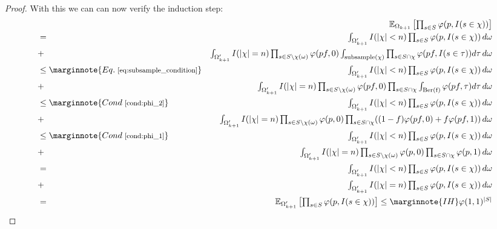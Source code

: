 \begin{proof}
With this we can can now verify the induction step:
\begin{eqnarray*}
&  & \textstyle\expect_{\Omega_{k+1}}\left[\prod_{s \in S} \phi(p, I(s \in \chi))\right]  \\
& = & \textstyle \int_{\Omega'_{k+1}} I(|\chi|<n)\prod_{s\in S} \phi(p, I(s \in \chi)) \, d \omega\\
& + & \textstyle \int_{\Omega'_{k+1}} I(|\chi|=n)
  \prod_{s \in S \setminus \chi(\omega)} \phi(pf,0) 
    \int_{\mathrm{subsample}(\chi)} \prod_{s \in S \cap \chi} \phi(pf,I(s \in \tau )) d \tau \, d \omega \\
& \leq \marginnote{\footnotesize Eq.~\ref{eq:subsample_condition}} & \textstyle \int_{\Omega'_{k+1}} 
  I(|\chi| < n)\prod_{s \in S} \phi(p, I(s \in \chi)) \, d \omega \\
& + & \textstyle \int_{\Omega'_{k+1}} I(|\chi| = n) \prod_{s \in S \setminus \chi(\omega)}
  \phi(pf,0) \prod_{s \in S \cap \chi} \int_{\mathrm{Ber(f)}} \phi(pf,\tau) d \tau \, d \omega  \\
& \leq \marginnote{\footnotesize Cond~\ref{cond:phi_2}}  &
  \textstyle \int_{\Omega'_{k+1}} I(|\chi| < n)\prod_{s \in S} \phi(p, I(s \in \chi)) \, d \omega \\
& + & \textstyle \int_{\Omega'_{k+1}} I(|\chi| = n) \prod_{s \in S \setminus \chi(\omega)} 
  \phi(p,0) \prod_{s \in S \cap \chi} ((1-f)\phi(pf,0)+f\phi(pf,1)) \, d \omega  \\
& \leq \marginnote{\footnotesize Cond~\ref{cond:phi_1}} & \textstyle \int_{\Omega'_{k+1}} I(|\chi| < n) 
  \prod_{s \in S} \phi(p, I(s \in \chi)) \, d \omega \\
& + & \textstyle \int_{\Omega'_{k+1}} I(|\chi| = n) \prod_{s \in S \setminus \chi(\omega)} 
  \phi(p,0) \prod_{s \in S \cap \chi} \phi(p,1) \, d \omega \\
& = & \textstyle \int_{\Omega'_{k+1}} I(|\chi|<n)\prod_{s \in S} \phi(p,I(s\in\chi)) \, d\omega \\
& + & \textstyle \int_{\Omega'_{k+1}} I(|\chi|=n)\prod_{s \in S} \phi(p,I(s\in\chi)) \, d\omega \\
& = & \textstyle \expect_{\Omega'_{k+1}}\left[\prod_{s \in S} \phi(p, I(s \in \chi)) \right] 
  \leq  \marginnote{\footnotesize IH} \phi(1,1)^{|S|}
\end{eqnarray*}
\end{proof}

